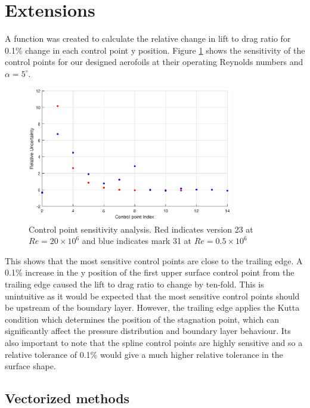\documentclass{article}
\begin{document}
\section{Extensions}

A function was created to calculate the relative change in lift to drag ratio for 0.1\% change in each control point y position.
Figure \ref{fig:ctrl_sensitivity} shows the sensitivity of the control points for our designed aerofoils at their operating Reynolds numbers and $\alpha = 5^\circ$.

\begin{figure}[H]
    \centering
    \includegraphics[width=0.8\textwidth]{figures/ctrl_sensitivity.eps}
    \caption{Control point sensitivity analysis. Red indicates version 23 at $Re = 20\times10^6$ and blue indicates mark 31 at $Re = 0.5\times10^6$}
    \label{fig:ctrl_sensitivity}
\end{figure}

This shows that the most sensitive control points are close to the trailing edge.
A 0.1\% increase in the y position of the first upper surface control point from the trailing edge caused the lift to drag ratio to change by ten-fold.
This is unintuitive as it would be expected that the most sensitive control points should be upstream of the boundary layer.
However, the trailing edge applies the Kutta condition which determines the position of the stagnation point, 
which can significantly affect the pressure distribution and boundary layer behaviour.
Its also important to note that the spline control points are highly sensitive and so a relative tolerance of 0.1\% would give a much higher relative tolerance in the surface shape.

\subsection{Vectorized methods}
\end{document}
